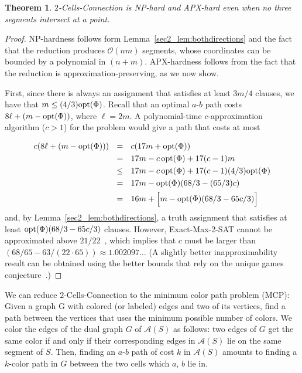\documentclass[11pt,a4paper]{article}
\newtheorem{theorem}[definition]{Theorem}
\begin{document}
\begin{theorem}\label{NP-hard}
 {\sc $2$-Cells-Connection} is NP-hard and APX-hard even when no three segments intersect at a point.
\end{theorem}
\begin{proof}
NP-hardness follows form Lemma~\ref{sec2_lem:bothdirections} and the fact that the reduction produces $\mathcal{O}(nm)$ segments, whose coordinates can be bounded by a polynomial in $(n+m)$. APX-hardness follows from the fact that the reduction is approximation-preserving, as we now show.

	First, since there is always an assignment that satisfies at least $3m/4$ clauses, we have that $m\le (4/3) {\rm opt}(\Phi)$. Recall that an optimal $a$-$b$ path costs $8\ell+ (m-{\rm opt}(\Phi))$, where $\ell=2m$. A polynomial-time $c$-approximation algorithm ($c>1$) for the problem would give a path that costs at most

	\begin{align*}
	c(8\ell+ (m-{\rm opt}(\Phi))) ~~&=~~  c(17m+{\rm opt}(\Phi))\\
									 &=~~  17m-c\,{\rm opt}(\Phi)+17(c-1)m\\
													&\le~~  17m-c\,{\rm opt}(\Phi) + 17(c-1)(4/3){\rm opt}(\Phi)\\
													&=~~  17m-{\rm opt}(\Phi)(68/3-(65/3)c)\\
													&=~~   16m+\Bigl[ m-{\rm opt}(\Phi)(68/3-65c/3) \Bigr]
	\end{align*}
	and, by Lemma~\ref{sec2_lem:bothdirections}, a truth assignment that satisfies at least 
	${\rm opt}(\Phi)(68/3-65c/3)$ clauses. However, {\sc Exact-Max-2-SAT} cannot be approximated 
	above $21/22$~\cite{Hastad01}, which implies that $c$ must be larger than $(68/65 - 63/(22\cdot 65))\approx 1.002097\dots$
	(A slightly better inapproximability result can be obtained using the better bounds that rely on the unique games conjecture~\cite{kkmo-oir-07}.)
\end{proof}

We can reduce {\sc $2$-Cells-Connection} to the minimum color path problem (MCP): 
Given a graph G with colored (or labeled) edges and two of its vertices, find a path between the vertices that uses the minimum possible number of colors.
We color the edges of the dual graph $G$ of $\mathcal{A}(S)$ as follows: two edges of $G$ get the same color if and only if their corresponding edges in $\mathcal{A}(S)$ lie on the same segment of $S$.
Then, finding an $a$-$b$ path of cost $k$ in $\mathcal{A}(S)$ amounts to finding a $k$-color path in $G$ between the two cells which $a$, $b$ lie in.
\end{document}
